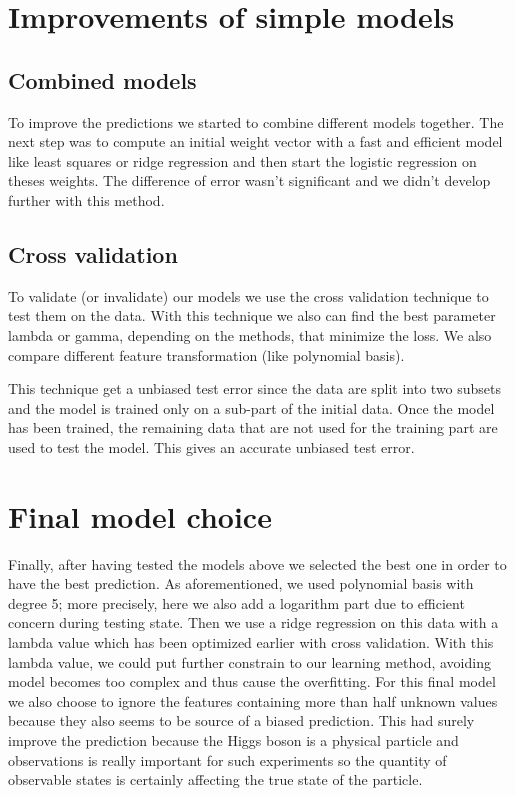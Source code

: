 \documentclass[10pt,conference,compsocconf]{IEEEtran}
\begin{document}
\section{Improvements of simple models}
\label{sec:tips-writing}
\subsection{Combined models}
To improve the predictions we started to combine different models together. The next step was to compute an initial
weight vector with a fast and efficient model like least squares or ridge regression and then start the logistic 
regression on theses weights. The difference of error wasn't significant and we didn't develop further with this method.

\subsection{Cross validation}
To validate (or invalidate) our models we use the cross validation technique to test them on the data. With this technique we also can find the best parameter lambda or gamma, depending on the methods, that minimize the loss.
We also compare different feature transformation (like polynomial basis).

This technique get a unbiased test error since the data are split into two subsets and the model is trained only on a sub-part of the initial data. Once the model has been trained, the remaining data that are not used for the training part are used to test the model. This gives an accurate unbiased test error.

\section{Final model choice}
Finally, after having tested the models above we selected the best one in order to have the best prediction.
As aforementioned, we used polynomial basis with degree 5; more precisely, here we also add a logarithm part due to efficient concern during testing state. Then we use a ridge regression on this data with a lambda value which has been optimized earlier with cross validation. With this lambda value, we could put further constrain to our learning method, avoiding model becomes too complex and thus cause the overfitting.
For this final model we also choose to ignore the features containing more than half unknown values because they also seems to be source of a biased prediction.
This had surely improve the prediction because the Higgs boson is a physical particle and observations is really important for such experiments so the quantity of observable states is certainly affecting the true state of the particle.
\end{document}
